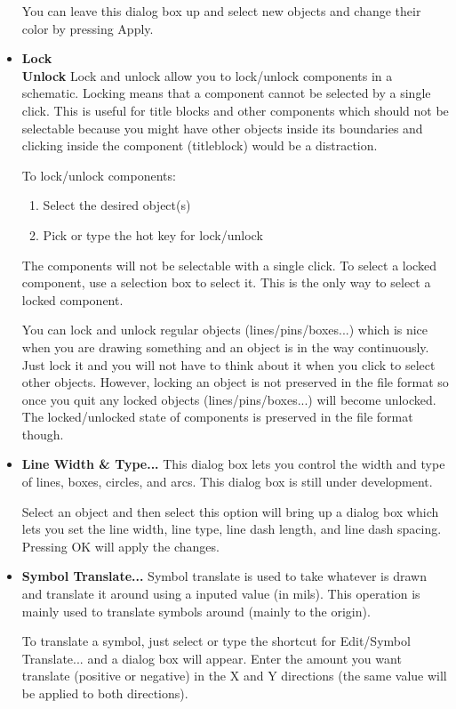 \documentclass{article}
\begin{document}
\begin{itemize}
You can leave this dialog box up and select new objects and change
their color by pressing Apply.

\item {\bf Lock}\\
  {\bf Unlock} Lock and unlock allow you to lock/unlock components in
  a schematic.  Locking means that a component cannot be selected by a
  single click.  This is useful for title blocks and other components
  which should not be selectable because you might have other objects
  inside its boundaries and clicking inside the component (titleblock)
  would be a distraction.
  
  To lock/unlock components:
\begin{enumerate}
\item Select the desired object(s)
\item Pick or type the hot key for lock/unlock
\end{enumerate}                        
The components will not be selectable with a single click.  To select
a locked component, use a selection box to select it.  This is the
only way to select a locked component.

You can lock and unlock regular objects (lines/pins/boxes...)  which
is nice when you are drawing something and an object is in the way
continuously.  Just lock it and you will not have to think about it
when you click to select other objects.  However, locking an object is
not preserved in the file format so once you quit any locked objects
(lines/pins/boxes...) will become unlocked.  The locked/unlocked state
of components is preserved in the file format though.

\item {\bf Line Width \& Type...}  This dialog box lets you control
  the width and type of lines, boxes, circles, and arcs.  This dialog
  box is still under development.
  
  Select an object and then select this option will bring up a dialog
  box which lets you set the line width, line type, line dash length,
  and line dash spacing.  Pressing OK will apply the changes.
  
\item {\bf Symbol Translate...}  Symbol translate is used to take
  whatever is drawn and translate it around using a inputed value (in
  mils).  This operation is mainly used to translate symbols around
  (mainly to the origin).
  
  To translate a symbol, just select or type the shortcut for
  Edit/Symbol Translate... and a dialog box will appear.  Enter the
  amount you want translate (positive or negative) in the X and Y
  directions (the same value will be applied to both directions).
  

\end{itemize}
\end{document}
